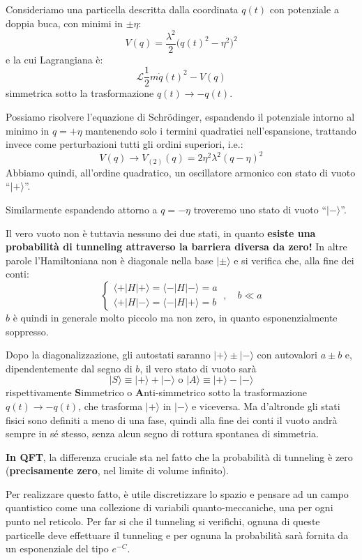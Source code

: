 \documentclass[../main.tex]{subfiles}
\begin{document}
\begin{example}
    Consideriamo una particella descritta dalla coordinata $q(t)$ con potenziale a doppia buca, con minimi in $\pm\eta$:
    \[
    V(q) = \frac{\lambda^2}{2}\big(q(t)^2-\eta^2\big)^2
    \]
    e la cui Lagrangiana è:
    \[
    \mathscr{L} \frac{1}{2}m\Dot{q}(t)^2 - V(q)
    \]
    simmetrica sotto la trasformazione $q(t)\rightarrow-q(t)$.

    Possiamo risolvere l'equazione di Schrödinger, espandendo il potenziale intorno al minimo in $q=+\eta$ mantenendo solo i termini quadratici nell'espansione, trattando invece come perturbazioni tutti gli ordini superiori, i.e.:
    \[
    V(q) \rightarrow V_{(2)}(q) = 2\eta^2\lambda^2(q-\eta)^2
    \]
    Abbiamo quindi, all'ordine quadratico, un oscillatore armonico con stato di vuoto “$|+\rangle$”.

    Similarmente espandendo attorno a $q=-\eta$ troveremo uno stato di vuoto “$|-\rangle$”.

    Il vero vuoto non è tuttavia nessuno dei due stati, in quanto \textbf{esiste una probabilità di tunneling attraverso la barriera diversa da zero!} In altre parole l'Hamiltoniana non è diagonale nella base $|\pm\rangle$ e si verifica che, alla fine dei conti:
    \[
    \begin{cases}
        \langle+|H|+\rangle = \langle-|H|-\rangle = a \\
        \langle+|H|-\rangle = \langle-|H|+\rangle = b 
    \end{cases}~,\quad b \ll a
    \]
    $b$ è quindi in generale molto piccolo ma non zero, in quanto esponenzialmente soppresso.

    Dopo la diagonalizzazione, gli autostati saranno $|+\rangle\pm|-\rangle$ con autovalori $a\pm b$ e, dipendentemente dal segno di $b$, il vero stato di vuoto sarà 
    \[
    |S\rangle \equiv |+\rangle+|-\rangle \text{ o }|A\rangle \equiv |+\rangle-|-\rangle
    \]
    rispettivamente \textbf{S}immetrico o \textbf{A}nti-simmetrico sotto la trasformazione $q(t)\rightarrow-q(t)$, che trasforma $|+\rangle$ in $|-\rangle$ e viceversa. Ma d'altronde gli stati fisici sono definiti a meno di una fase, quindi alla fine dei conti il vuoto andrà sempre in sé stesso, senza alcun segno di rottura spontanea di simmetria.

    \textbf{In QFT}, la differenza cruciale sta nel fatto che la probabilità di tunneling è zero (\textbf{precisamente zero}, nel limite di volume infinito).

    Per realizzare questo fatto, è utile discretizzare lo spazio e pensare ad un campo quantistico come una collezione di variabili quanto-meccaniche, una per ogni punto nel reticolo. Per far si che il tunneling si verifichi, ognuna di queste particelle deve effettuare il tunneling e per ognuna la probabilità sarà fornita da un esponenziale del tipo $e^{-C}$.


\end{example}
\end{document}

